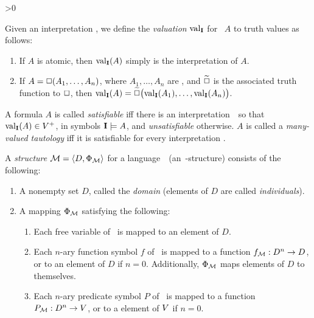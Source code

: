 \documentclass{article}
\begin{document}
   \ifnum\NoOps>0
      \begin{definition}
      Given an interpretation \I, we define the {\em valuation\/} ${\rm val}_{{\bf I}}$
      for \formulae\ $A$ to truth values as follows:
      \begin{enumerate}
      \item If $A$ is atomic, then ${\rm val}_{{\bf I}}(A)$ simply is the interpretation
            of $A$.
      \item If $A=\operator(A_1,\ldots,A_n)$,
            where $A_1,\ldots,A_n$ are \formulae, and $\toperator$ is the
            associated truth function to $\operator$, then
            $\val_{\I}(A)=\toperator\bigl(\val_{\I}(A_1),\ldots,\val_{\I}(A_n)\bigr)$.
      \end{enumerate}
      \end{definition}
   \fi
   \begin{definition}
   A formula $A$ is called {\em satisfiable\/} iff there is an
   interpretation~\I\ so that ${\rm val}_{{\bf I}}(A)\in V^+$, in symbols ${\bf I}\models A$,
   and {\em unsatisfiable\/} otherwise.
   $A$ is called a {\em many-valued tautology\/} iff it is
   satisfiable for every interpretation \I.
   \end{definition}
\else
   \begin{definition}
   A {\em structure\/} $\M = \langle D,\Phi_{\M}\rangle$ for
   a language~\LL\ (an~\LL-structure) consists of the following:
   \begin{enumerate}
   \item A nonempty set $D$, called the {\em domain\/} (elements of $D$
         are called {\em individuals}).
   \item A mapping $\Phi_{\M}$ satisfying the following:
         \begin{enumerate}
         \item Each free variable of \LL\ is mapped to an element of $D$.
         \item Each $n$-ary function symbol $f$ of \LL\ is mapped to a
               function $f_{\M}:D^n \to D$, or to an element of $D$ if $n=0$.
               Additionally, $\Phi_{\M}$ maps elements of $D$ to themselves.
         \item Each $n$-ary predicate symbol $P$ of \LL\ is mapped to a
               function $P_{\M}:D^n \to \TVs$, or to a element of $V$ if $n=0$.
         \end{enumerate}
   \end{enumerate}
   \end{definition}
\end{document}
